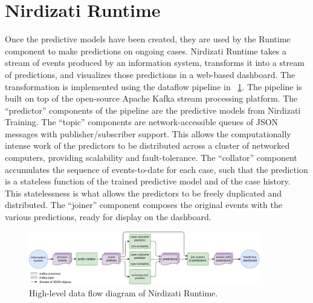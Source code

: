 \documentclass[runningheads,a4paper]{llncs}
\begin{document}



\section{Nirdizati Runtime} \label{sec:runtime}
Once the predictive models have been created, they are used by the Runtime component to make predictions on ongoing cases.
Nirdizati Runtime takes a stream of events produced by an information system, transforms it into a stream of predictions, and visualizes those predictions in a web-based dashboard.
The transformation is implemented using the dataflow pipeline in \figurename~\ref{fig:dfd_0}. 
The pipeline is built on top of the open-source Apache Kafka stream processing platform. The ``predictor'' components of the pipeline are the predictive models from Nirdizati Training. The ``topic'' components are network-accessible queues of JSON messages with publisher/subscriber support. This allows the computationally intense work of the predictors to be distributed across a cluster of networked computers, providing scalability and fault-tolerance.
The ``collator'' component accumulates the sequence of events-to-date for each case, such that the prediction is a stateless function of the trained predictive model and of the case history.  This statelessness is what allows the predictors to be freely duplicated and distributed.  The ``joiner'' component composes the original events with the various predictions, ready for display on the dashboard.

\begin{figure}[t]
	\centering
	\includegraphics[width=0.9\textwidth]{img/nirdizati-dataflow}
	\caption{High-level data flow diagram of Nirdizati Runtime.}
	\label{fig:dfd_0}
\end{figure}
\end{document}
